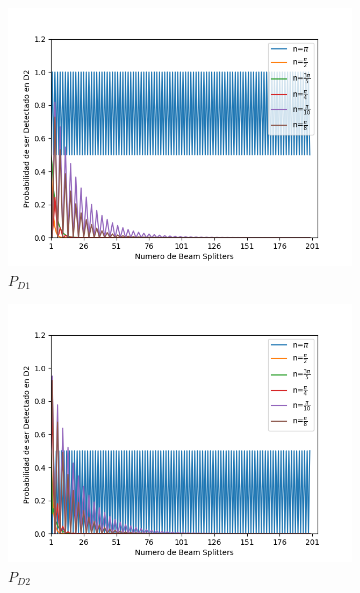 \documentclass[11pt]{article}
\begin{document}
  \begin{figure}[h!]
\centering
\begin{subfigure}[b]{0.45\linewidth}
\includegraphics[width=\linewidth]{BsFijo_azumaD1.png}
\caption{$P_{D1}$}
\label{fig:BS1}
\end{subfigure}
\begin{subfigure}[b]{0.45\linewidth}
\includegraphics[width=\linewidth]{BsFijo_azumaD2.png}
\caption{$P_{D2}$}
\label{fig:westminster_aerea}
\end{subfigure}
\begin{subfigure}[b]{0.45\linewidth}

\end{subfigure}
\end{figure}
\end{document}
